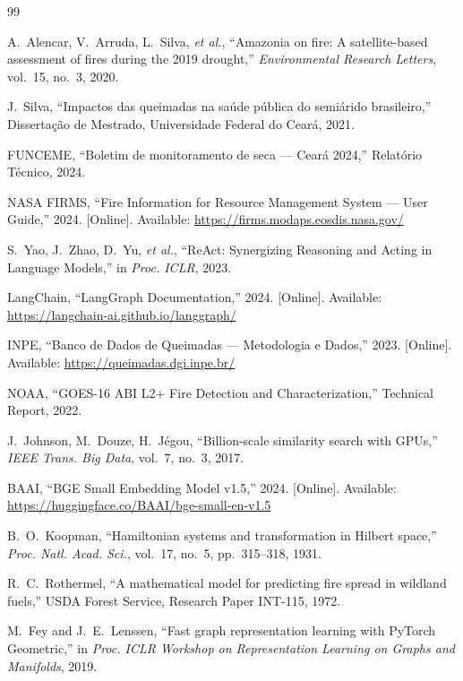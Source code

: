 \documentclass[preprint,times,numbers]{elsarticle}
\begin{document}
\begin{thebibliography}{99}

A.~Alencar, V.~Arruda, L.~Silva, \emph{et al.}, ``Amazonia on fire: A satellite-based assessment of fires during the 2019 drought,'' \textit{Environmental Research Letters}, vol.~15, no.~3, 2020.

J.~Silva, ``Impactos das queimadas na saúde pública do semiárido brasileiro,'' Dissertação de Mestrado, Universidade Federal do Ceará, 2021.

FUNCEME, ``Boletim de monitoramento de seca --- Ceará 2024,'' Relatório Técnico, 2024.

NASA FIRMS, ``Fire Information for Resource Management System --- User Guide,'' 2024. [Online]. Available: \url{https://firms.modaps.eosdis.nasa.gov/}

S.~Yao, J.~Zhao, D.~Yu, \emph{et al.}, ``ReAct: Synergizing Reasoning and Acting in Language Models,'' in \textit{Proc. ICLR}, 2023.

LangChain, ``LangGraph Documentation,'' 2024. [Online]. Available: \url{https://langchain-ai.github.io/langgraph/}

INPE, ``Banco de Dados de Queimadas --- Metodologia e Dados,'' 2023. [Online]. Available: \url{https://queimadas.dgi.inpe.br/}

NOAA, ``GOES-16 ABI L2+ Fire Detection and Characterization,'' Technical Report, 2022.

J.~Johnson, M.~Douze, H.~Jégou, ``Billion-scale similarity search with GPUs,'' \textit{IEEE Trans. Big Data}, vol.~7, no.~3, 2017.

BAAI, ``BGE Small Embedding Model v1.5,'' 2024. [Online]. Available: \url{https://huggingface.co/BAAI/bge-small-en-v1.5}

B.~O.~Koopman, ``Hamiltonian systems and transformation in Hilbert space,'' \textit{Proc. Natl. Acad. Sci.}, vol.~17, no.~5, pp.~315--318, 1931.

R.~C.~Rothermel, ``A mathematical model for predicting fire spread in wildland fuels,'' USDA Forest Service, Research Paper INT-115, 1972.

M.~Fey and J.~E.~Lenssen, ``Fast graph representation learning with PyTorch Geometric,'' in \textit{Proc. ICLR Workshop on Representation Learning on Graphs and Manifolds}, 2019.


\end{thebibliography}
\end{document}
